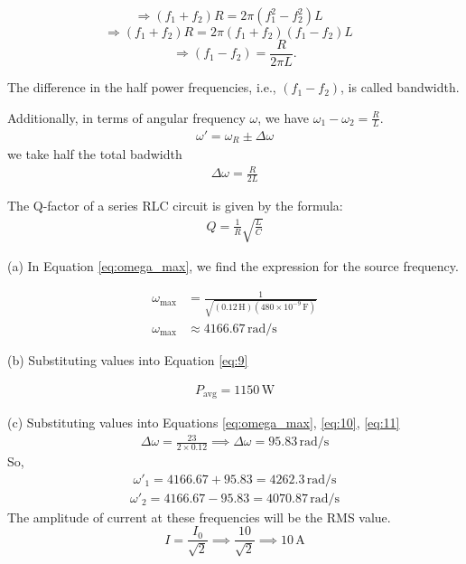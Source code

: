 \documentclass[journal,12pt,twocolumn]{IEEEtran}
\theoremstyle{remark}
\begin{document}
\[
\Rightarrow (f_1 + f_2) R = 2\pi (f_1^2 - f_2^2) L \quad 
\]
\[
\Rightarrow (f_1 + f_2) R = 2\pi (f_1 + f_2)(f_1 - f_2) L \quad \]
\[\Rightarrow (f_1 - f_2) = \frac{R}{2\pi L}.\]

The difference in the half power frequencies, i.e., $(f_1 - f_2)$, is called bandwidth.

Additionally, in terms of angular frequency \(\omega\), we have \(\omega_1 - \omega_2 = \frac{R}{L}\).
\begin{align}
    \omega' = \omega_R \pm \Delta\omega \label{eq:10}
\end{align}
we take half the total badwidth
\begin{align}
 \Delta\omega = \frac{R}{2L} 
 \label{eq:11}
\end{align}

The Q-factor of a series RLC circuit is given by the formula:
\begin{align}
    Q = \frac{1}{R} \sqrt{\frac{L}{C}} \label{eq:Qfact}
\end{align}

(a) In Equation \eqref{eq:omega_max}, we find the expression for the source frequency.

\begin{align}
    \omega_{\text{max}} &= \frac{1}{\sqrt{(0.12 \, \text{H})(480 \times 10^{-9} \, \text{F})}} \\
    \omega_{\text{max}} &\approx 4166.67 \, \text{rad/s}
\end{align}

(b)
Substituting values into Equation \eqref{eq:9}

\begin{align}
    P_{\text{avg}} = 1150 \, \text{W}
\end{align}

(c)
Substituting values into Equations \eqref{eq:omega_max}, \eqref{eq:10}, \eqref{eq:11}
\begin{align}
    \Delta\omega = \frac{23}{2 \times 0.12} \implies \Delta\omega = 95.83 \, \text{rad/s}
\end{align}
So,
\begin{align}
    \omega'_1 = 4166.67 + 95.83 = 4262.3 \, \text{rad/s} 
\end{align}
\begin{align}
    \omega'_2 = 4166.67 - 95.83 = 4070.87 \, \text{rad/s} 
\end{align}
The amplitude of current at these frequencies will be the RMS value.
\[
    I = \frac{I_0}{\sqrt{2}} \implies \frac{10}{\sqrt{2}} \implies 10 \, \text{A}
\]
\end{document}
